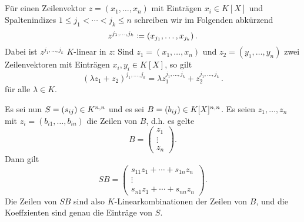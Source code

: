 \section{}


Für einen Zeilenvektor $z = (x_1, \dotsc, x_n)$ mit Einträgen $x_i \in K[X]$ und Spaltenindizes $1 \leq j_1 < \dotsb < j_k \leq n$ schreiben wir im Folgenden abkürzend
\[
            z^{j_1, \dotsc, j_k}
  \defined  (x_{j_1}, \dotsc, x_{j_k}) \,.
\]
Dabei ist $z^{j_1, \dotsc, j_k}$ $K$-linear in $z$:
Sind $z_1 = (x_1, \dotsc, x_n)$ und $z_2 = (y_1, \dotsc, y_n)$ zwei Zeilenvektoren mit Einträgen $x_i, y_i \in K[X]$, so gilt
\[
    (\lambda z_1 + z_2)^{j_1, \dotsc, j_k}
  = \lambda z_1^{j_1, \dotsc, j_k} + z_2^{j_1, \dotsc, j_k} \,. 
\]
für alle $\lambda \in K$.

Es sei nun $S = (s_{ij}) \in \matrices{n}{K}$ und es sei $B = (b_{ij}) \in \matrices{n}{K[X]}$.
Es seien $z_1, \dotsc, z_n$ mit $z_i = (b_{i1}, \dotsc, b_{in})$ die Zeilen von $B$, d.h. es gelte
\[
    B 
  = \begin{pmatrix}
      z_1     \\
      \vdots  \\
      z_n
    \end{pmatrix}.
\]
Dann gilt
\[
    S B
  = \begin{pmatrix}
      s_{11} z_1 + \dotsb + s_{1n} z_n \\
      \vdots                                        \\
      s_{n1} z_1 + \dotsb + s_{nn} z_n
    \end{pmatrix}.
\]
Die Zeilen von $SB$ sind also $K$-Linearkombinationen der Zeilen von $B$, und die Koeffzienten sind genau die Einträge von $S$.

